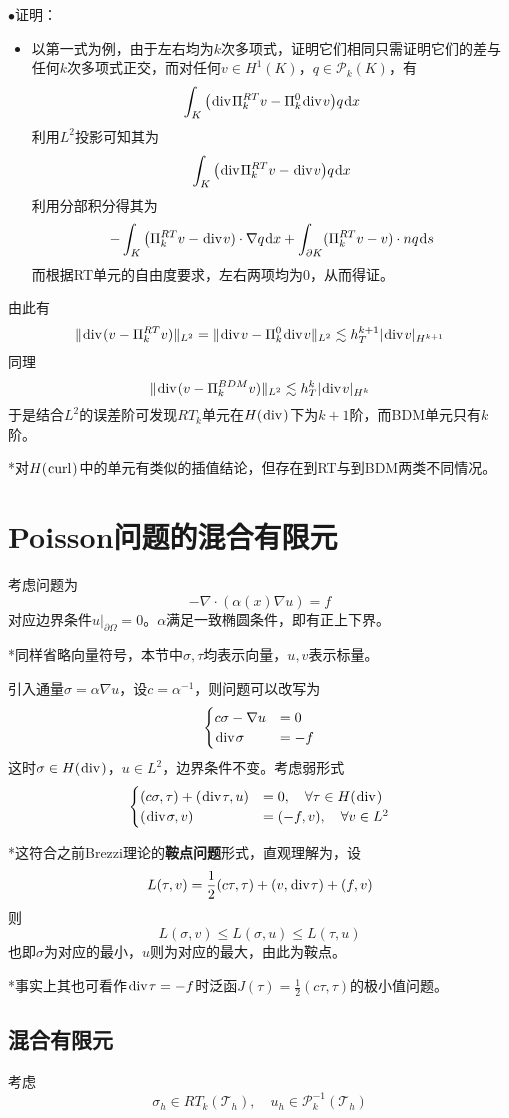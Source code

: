 \documentclass[a4paper,UTF8,fontset=windows]{ctexart}
\newcommand*{\dr}{\hspace{0.07em}\mathrm{d}}
\newcommand*{\cp}{\mathcal{P}}
\newcommand*{\ct}{\mathcal{T}}
\renewcommand*{\div}{\hspace{0.07em}\mathrm{div}\hspace{0.07em}}
\newcommand*{\curl}{\hspace{0.07em}\mathrm{curl}\hspace{0.07em}}
\newcommand{\proo}[1]{{\kaishu $\bullet$证明：
\begin{itemize}
    \item[] #1
\end{itemize}
}}
\begin{document}
\proo{
    以第一式为例，由于左右均为$k$次多项式，证明它们相同只需证明它们的差与任何$k$次多项式正交，而对任何$v\in H^1(K)$，$q\in\cp_k(K)$，有
    $$\int_K\big(\div\Pi_k^{RT}v-\Pi_k^0\div v\big)q\dr x$$
    利用$L^2$投影可知其为
    $$\int_K\big(\div\Pi_k^{RT}v-\div v\big)q\dr x$$
    利用分部积分得其为
    $$-\int_K\big(\Pi_k^{RT}v-\div v)\cdot\nabla q\dr x+\int_{\partial K}(\Pi_k^{RT}v-v)\cdot nq\dr s$$
    而根据RT单元的自由度要求，左右两项均为0，从而得证。
}

由此有
$$\|\div(v-\Pi_k^{RT}v)\|_{L^2}=\|\div v-\Pi_k^0\div v\|_{L^2}\lesssim h_T^{k+1}|\div v|_{H^{k+1}}$$
同理
$$\|\div(v-\Pi_k^{BDM}v)\|_{L^2}\lesssim h_T^k|\div v|_{H^k}$$
于是结合$L^2$的误差阶可发现$RT_k$单元在$H(\div)$下为$k+1$阶，而BDM单元只有$k$阶。

*对$H(\curl)$中的单元有类似的插值结论，但存在到RT与到BDM两类不同情况。

\section{Poisson问题的混合有限元}
考虑问题为
$$-\nabla\cdot(\alpha(x)\nabla u)=f$$
对应边界条件$u\big|_{\partial\Omega}=0$。$\alpha$满足一致椭圆条件，即有正上下界。

*同样省略向量符号，本节中$\sigma,\tau$均表示向量，$u,v$表示标量。

引入通量$\sigma=\alpha\nabla u$，设$c=\alpha^{-1}$，则问题可以改写为
$$\begin{cases}c\sigma-\nabla u&=0\\\div\sigma&=-f\end{cases}$$
这时$\sigma\in H(\div)$，$u\in L^2$，边界条件不变。考虑弱形式
$$\begin{cases}(c\sigma,\tau)+(\div\tau,u)&=0,\quad\forall\tau\in H(\div)\\(\div\sigma,v)&=(-f,v),\quad\forall v\in L^2\end{cases}$$

*这符合之前Brezzi理论的\textbf{鞍点问题}形式，直观理解为，设
$$L(\tau,v)=\frac{1}{2}(c\tau,\tau)+(v,\div\tau)+(f,v)$$
则
$$L(\sigma,v)\le L(\sigma,u)\le L(\tau,u)$$
也即$\sigma$为对应的最小，$u$则为对应的最大，由此为鞍点。

*事实上其也可看作$\div\tau=-f$时泛函$J(\tau)=\frac{1}{2}(c\tau,\tau)$的极小值问题。

\subsection{混合有限元}
考虑
$$\sigma_h\in RT_k(\ct_h),\quad u_h\in\cp_k^{-1}(\ct_h)$$
\end{document}

